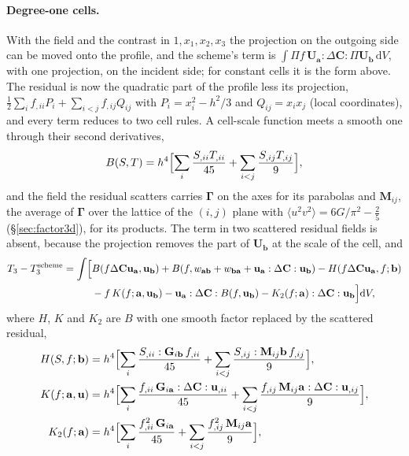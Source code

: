 \documentclass[11pt,a4paper]{article}
\newcommand{\dd}{\mathrm{d}}
\begin{document}
\paragraph{Degree-one cells.} With the field and the contrast in $1,x_1,x_2,x_3$ the projection on the
outgoing side can be moved onto the profile, and the scheme's term is
$\int\Pi f\,\mathbf{U}_{\mathbf{a}}:\Delta\mathbf{C}:\Pi\mathbf{U}_{\mathbf{b}}\,\dd V$, with one
projection, on the incident side; for constant cells it is the form above. The residual is now the
quadratic part of the profile less its projection, $\tfrac12\sum_if_{,ii}P_i+\sum_{i<j}f_{,ij}Q_{ij}$ with
$P_i=x_i^2-h^2/3$ and $Q_{ij}=x_ix_j$ (local coordinates), and every term reduces to two cell rules. A
cell-scale function meets a smooth one through their second derivatives,
\begin{equation}\label{eq:Brule}
  B(S,T)=h^4\Bigl[\sum_i\frac{S_{,ii}T_{,ii}}{45}+\sum_{i<j}\frac{S_{,ij}T_{,ij}}{9}\Bigr],
\end{equation}
and the field the residual scatters carries $\boldsymbol\Gamma$ on the axes for its parabolas and
$\mathbf{M}_{ij}$, the average of $\boldsymbol\Gamma$ over the lattice of the $(i,j)$ plane with
$\langle u^2v^2\rangle=6G/\pi^2-\tfrac25$ (\S\ref{sec:factor3d}), for its products. The term in two
scattered residual fields is absent, because the projection removes the part of $\mathbf{U}_{\mathbf{b}}$
at the scale of the cell, and
\begin{equation}\label{eq:F3lin}
\begin{split}
  T_3-T_3^{\mathrm{scheme}}=\int\Bigl[&B(f\Delta\mathbf{C}\mathbf{u}_{\mathbf{a}},\mathbf{u}_{\mathbf{b}})
   +B(f,w_{\mathbf{ab}}+w_{\mathbf{ba}}+\mathbf{u}_{\mathbf{a}}:\Delta\mathbf{C}:\mathbf{u}_{\mathbf{b}})
   -H(f\Delta\mathbf{C}\mathbf{u}_{\mathbf{a}},f;\mathbf{b})\\
  &-f\,K(f;\mathbf{a},\mathbf{u}_{\mathbf{b}})-\mathbf{u}_{\mathbf{a}}:\Delta\mathbf{C}:B(f,\mathbf{u}_{\mathbf{b}})
   -K_2(f;\mathbf{a}):\Delta\mathbf{C}:\mathbf{u}_{\mathbf{b}}\Bigr]\dd V,
\end{split}
\end{equation}
where $H$, $K$ and $K_2$ are $B$ with one smooth factor replaced by the scattered residual,
\begin{align*}
  H(S,f;\mathbf{b})&=h^4\Bigl[\sum_i\frac{S_{,ii}:\mathbf{G}_{i\mathbf{b}}\,f_{,ii}}{45}
    +\sum_{i<j}\frac{S_{,ij}:\mathbf{M}_{ij}\mathbf{b}\,f_{,ij}}{9}\Bigr],\\
  K(f;\mathbf{a},\mathbf{u})&=h^4\Bigl[\sum_i\frac{f_{,ii}\,\mathbf{G}_{i\mathbf{a}}:\Delta\mathbf{C}:\mathbf{u}_{,ii}}{45}
    +\sum_{i<j}\frac{f_{,ij}\,\mathbf{M}_{ij}\mathbf{a}:\Delta\mathbf{C}:\mathbf{u}_{,ij}}{9}\Bigr],\\
  K_2(f;\mathbf{a})&=h^4\Bigl[\sum_i\frac{f_{,ii}^2\,\mathbf{G}_{i\mathbf{a}}}{45}
    +\sum_{i<j}\frac{f_{,ij}^2\,\mathbf{M}_{ij}\mathbf{a}}{9}\Bigr],
\end{align*}
\end{document}
